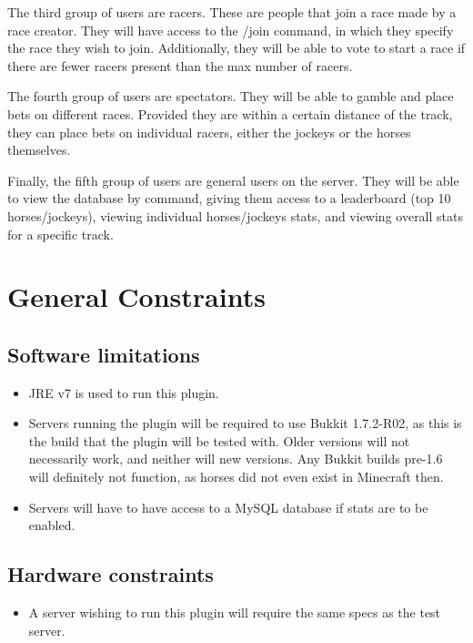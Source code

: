 \documentclass[a4paper, 11pt]{article} %
\begin{document}
The third group of users are racers. These are people that join a race made by a race creator. They will have access to the /join command, in which they specify the race they wish to join. Additionally, they will be able to vote to start a race if there are fewer racers present than the max number of racers.

The fourth group of users are spectators. They will be able to gamble and place bets on different races. Provided they are within a certain distance of the track, they can place bets on individual racers, either the jockeys or the horses themselves.

Finally, the fifth group of users are general users on the server. They will be able to view the database by command, giving them access to a leaderboard (top 10 horses/jockeys), viewing individual horses/jockeys stats, and viewing overall stats for a specific track.

\newpage

\section{General Constraints}

\subsection{Software limitations}

\begin{itemize}
	\item JRE v7 is used to run this plugin.
	\item Servers running the plugin will be required to use Bukkit 1.7.2-R02, as this is the build that the plugin will be tested with. Older versions will not necessarily work, and neither will new versions. Any Bukkit builds pre-1.6 will definitely not function, as horses did not even exist in Minecraft then.
	\item Servers will have to have access to a MySQL database if stats are to be enabled.
\end{itemize}

\subsection{Hardware constraints}

\begin{itemize}
	\item A server wishing to run this plugin will require the same specs as the test server.
\end{itemize}
\end{document}
